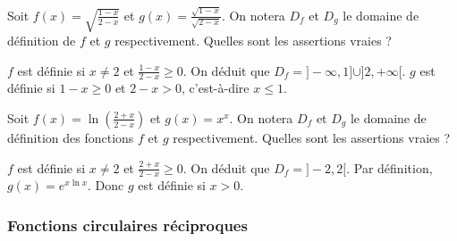 \begin{question} 
Soit $ f(x)= \sqrt{\frac{1-x}{2-x}} $ et $g(x)=\frac{\sqrt{1-x}}{\sqrt{2-x}}$. On notera $D_f$ et $D_g$ le domaine de définition de $f$ et $g$ respectivement. Quelles sont les assertions vraies ?
\begin{answers}
    \good{$D_f=]-\infty, 1] \cup ]2,+\infty[$}

    \bad{$D_f= [1,2[$}

    \good{$D_g=]-\infty, 1]$}

    \bad{$D_g=]-\infty, 2[$}
\end{answers}
\begin{explanations}
$f$ est définie  si $x\neq 2$ et $\frac{1-x}{2-x}\ge 0$. On déduit que 
$D_f=]-\infty, 1] \cup ]2,+\infty[$. $g$ est définie  si $1-x \ge 0$ et $2-x > 0$,  c'est-à-dire $x\le 1$. 
\end{explanations}

\end{question}







\begin{question} 
Soit $ f(x)= \ln(\frac{2+x}{2-x}) $ et $g(x)=x^x$. On notera $D_f$ et $D_g$ le domaine de définition des fonctions $f$ et $g$ respectivement. Quelles sont les assertions vraies ?
\begin{answers}

    \good{$D_f=]-2,2[$}


    \good{$D_g=]0,+\infty[$}
\end{answers}
\begin{explanations}
$f$ est définie  si $x\neq 2$ et $\frac{2+x}{2-x}\ge 0$. On déduit que 
 $D_f=]-2,2[$. Par définition, $g(x)=e^{x\ln x}$. Donc $g$ est définie si $x>0$.
\end{explanations}

\end{question}


\subsubsection{Fonctions circulaires réciproques}


